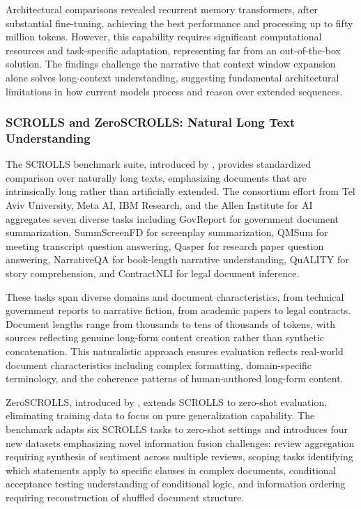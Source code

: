\documentclass[11pt,letterpaper]{article}
\begin{document}
Architectural comparisons revealed recurrent memory transformers, after substantial fine-tuning, achieving the best performance and processing up to fifty million tokens. However, this capability requires significant computational resources and task-specific adaptation, representing far from an out-of-the-box solution. The findings challenge the narrative that context window expansion alone solves long-context understanding, suggesting fundamental architectural limitations in how current models process and reason over extended sequences.

\subsubsection{SCROLLS and ZeroSCROLLS: Natural Long Text Understanding}

The SCROLLS benchmark suite, introduced by \cite{shaham2022scrolls}, provides standardized comparison over naturally long texts, emphasizing documents that are intrinsically long rather than artificially extended. The consortium effort from Tel Aviv University, Meta AI, IBM Research, and the Allen Institute for AI aggregates seven diverse tasks including GovReport for government document summarization, SummScreenFD for screenplay summarization, QMSum for meeting transcript question answering, Qasper for research paper question answering, NarrativeQA for book-length narrative understanding, QuALITY for story comprehension, and ContractNLI for legal document inference.

These tasks span diverse domains and document characteristics, from technical government reports to narrative fiction, from academic papers to legal contracts. Document lengths range from thousands to tens of thousands of tokens, with sources reflecting genuine long-form content creation rather than synthetic concatenation. This naturalistic approach ensures evaluation reflects real-world document characteristics including complex formatting, domain-specific terminology, and the coherence patterns of human-authored long-form content.

ZeroSCROLLS, introduced by \cite{shaham2023zeroscrolls}, extends SCROLLS to zero-shot evaluation, eliminating training data to focus on pure generalization capability. The benchmark adapts six SCROLLS tasks to zero-shot settings and introduces four new datasets emphasizing novel information fusion challenges: review aggregation requiring synthesis of sentiment across multiple reviews, scoping tasks identifying which statements apply to specific clauses in complex documents, conditional acceptance testing understanding of conditional logic, and information ordering requiring reconstruction of shuffled document structure.
\end{document}
